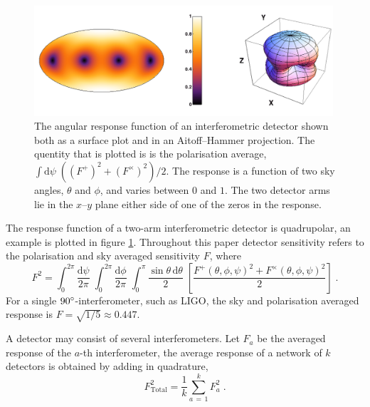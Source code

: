 \begin{figure}
 \centering
 \includegraphics[trim=0cm 0cm 0cm 0cm, width=0.99\textwidth]{LIGO_detectorframe.pdf}
 \caption{The angular response function of an interferometric detector shown both as a surface plot and in an Aitoff--Hammer projection. The quentity that is plotted is is the polarisation average, $\int\textrm{d}\psi \;((F^{+})^{2}+(F^{\times})^{2})/2$. The response is a function of two sky angles, $\theta$ and $\phi$, and varies between $0$ and $1$. The two detector arms lie in the $x$--$y$ plane either side of one of the zeros in the response.}
 \label{fig:LIGO}
\end{figure}

The response function of a two-arm interferometric detector is quadrupolar, an example is plotted in figure \ref{fig:LIGO}. Throughout this paper detector sensitivity refers to the polarisation and sky averaged sensitivity $F$, where
\begin{equation}\label{eq:skyav}
F^{2}=\int_{0}^{2\pi}\frac{\mathrm{d}\psi}{2\pi}\; \int_{0}^{2\pi} \frac{\mathrm{d}\phi}{2\pi}\; \int_{0}^{\pi}\frac{\sin\theta\,\mathrm{d}\theta}{2}\;\left[\frac{F^{+}\left(\theta,\phi,\psi\right)^{2}+F^{\times}\left(\theta,\phi,\psi\right)^{2}}{2}\right]\; .
\end{equation}
For a single $90^\circ$-interferometer, such as LIGO, the sky and polarisation averaged response is $F=\sqrt{1/5}\approx 0.447$.

A detector may consist of several interferometers. Let $F_{a}$ be the averaged response of the $a$-th interferometer, the average response of a network of $k$ detectors is obtained by adding in quadrature,
\begin{equation} F_{\mathrm{Total}}^{2}=\frac{1}{k}\sum_{a\,=\,1}^{k}F_{a}^{2} \; .\end{equation}

